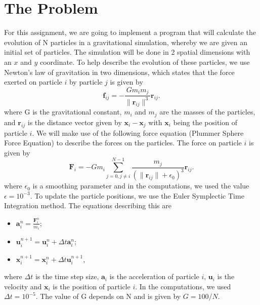 \documentclass{article}
\begin{document}
\newcommand{\CC}{C\nolinebreak\hspace{-.05em}\raisebox{.4ex}{\tiny\bf +}\nolinebreak\hspace{-.10em}\raisebox{.4ex}{\tiny\bf +}}
\def\CC{{C\nolinebreak[4]\hspace{-.05em}\raisebox{.4ex}{\tiny\bf ++}}}

\hypersetup{pageanchor=true}
\tableofcontents
\newpage
\section{The Problem}
For this assignment, we are going to implement a program that will calculate the evolution of N particles in a gravitational simulation, whereby we are given an initial set of particles. The simulation will be done in 2 spatial dimensions with an $x$ and $y$ coordinate.
To help describe the evolution of these particles, we use Newton's law of gravitation in two dimensions, which states that the force exerted on particle $i$ by particle $j$ is given by\vspace{0.3cm}
$$\boldsymbol{f}_{ij} = -\frac{Gm_{i}m_{j}}{\|\boldsymbol{r}_{ij}\|^{3}}\boldsymbol{r}_{ij}.$$
where G is the gravitational constant, $m_{i}$ and $m_{j}$ are the masses of the particles, and $\boldsymbol{r}_{ij}$ is the distance vector given by $\boldsymbol{x}_{i} -\boldsymbol{x}_{j}$ with $\boldsymbol{x}_{i}$ being the position of particle $i$. We will make use of the following force equation (Plummer Sphere Force Equation) to describe the forces on the particles. The force on particle $i$ is given by\vspace{0.3cm}
    $$\boldsymbol{F}_{i} = -Gm_{i}\sum_{j = 0, j \neq i}^{N-1}\frac{m_{j}}{(\|\boldsymbol{r}_{ij}\| + \epsilon_{0})^{3}}\boldsymbol{r}_{ij}.$$
where $\epsilon_{0}$ is a smoothing parameter and in the computations, we used the value $\epsilon = 10^{-3}$. To update the particle positions, we use the Euler Symplectic Time Integration method. The equations describing this are\vspace{0.3cm}
    \begin{itemize}
        \item $\boldsymbol{a}_{i}^{n} = \frac{\boldsymbol{F}_{i}^{n}}{m_{i}}$;
        \item $\boldsymbol{u}_{i}^{n+1} = \boldsymbol{u}_{i}^{n} + \Delta t\boldsymbol{a}_{i}^{n}$;
        \item $\boldsymbol{x}_{i}^{n+1} = \boldsymbol{x}_{i}^{n} + \Delta t\boldsymbol{u}_{i}^{n+1}$,
    \end{itemize}
\vspace{0.3cm}
where $\Delta t$ is the time step size, $\boldsymbol{a}_{i}$ is the acceleration of particle $i$, $\boldsymbol{u}_{i}$ is the velocity and $\boldsymbol{x}_{i}$ is the position of particle $i$. In the computations, we used $\Delta t = 10^{-5}$. The value of G depends on N and is given by $G = 100/N$.
\newpage
\end{document}
